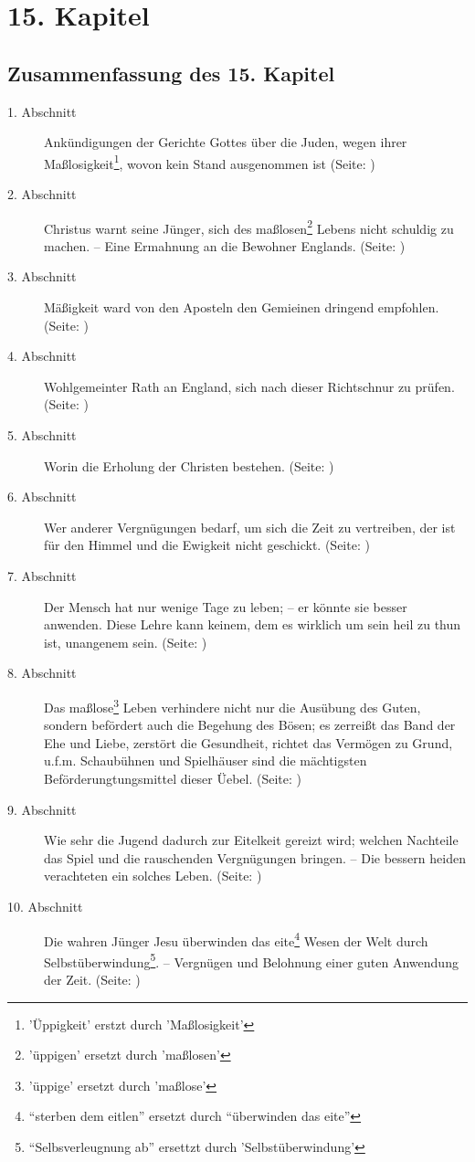 

\chapter{15. Kapitel} \label{kap15}

\section{Zusammenfassung des 15. Kapitel}
\small
\begin{description}
\item[1. Abschnitt] Ankündigungen der Gerichte Gottes über die Juden, wegen
ihrer Maßlosigkeit\footnote{'Üppigkeit' erstzt durch 'Maßlosigkeit'}, wovon
kein Stand ausgenommen ist (Seite: \pageref{kap15_ab1})
\item[2. Abschnitt] Christus warnt seine Jünger, sich des
maßlosen\footnote{'üppigen' ersetzt durch 'maßlosen'} Lebens nicht
schuldig zu machen. -- Eine Ermahnung an die Bewohner Englands. (Seite:
\pageref{kap15_ab2})
\item[3. Abschnitt] Mäßigkeit ward von den Aposteln den Gemieinen dringend
empfohlen. (Seite: \pageref{kap15_ab3})
\item[4. Abschnitt] Wohlgemeinter Rath an England, sich nach dieser Richtschnur
zu prüfen. (Seite: \pageref{kap15_ab4})
\item[5. Abschnitt] Worin die Erholung der Christen bestehen. (Seite:
\pageref{kap15_ab5})
\item[6. Abschnitt] Wer anderer Vergnügungen bedarf, um sich die Zeit zu
vertreiben, der ist für den Himmel und die Ewigkeit nicht geschickt. (Seite:
\pageref{kap15_ab6})
\item[7. Abschnitt] Der Mensch hat nur wenige Tage zu leben; -- er könnte sie
besser anwenden. Diese Lehre kann keinem, dem es wirklich um sein heil zu thun
ist, unangenem sein. (Seite: \pageref{kap15_ab6})
\item[8. Abschnitt] Das maßlose\footnote{'üppige' ersetzt durch 'maßlose'}
Leben verhindere nicht nur die Ausübung des
Guten, sondern befördert auch die Begehung des Bösen; es zerreißt das Band der
Ehe und Liebe, zerstört die Gesundheit, richtet das Vermögen zu Grund, u.f.m.
Schaubühnen und Spielhäuser sind die mächtigsten Beförderungtungsmittel dieser
Üebel. (Seite: \pageref{kap15_ab8})
\item[9. Abschnitt] Wie sehr die Jugend dadurch zur Eitelkeit gereizt wird;
welchen Nachteile das Spiel und die rauschenden Vergnügungen bringen. -- Die
bessern heiden verachteten ein solches Leben. (Seite: \pageref{kap15_ab9})
\item[10. Abschnitt] Die wahren Jünger Jesu überwinden das
eite\footnote{"`sterben dem eitlen"' ersetzt durch "`überwinden das eite"'}
Wesen der Welt
durch Selbstüberwindung\footnote{"`Selbsverleugnung ab"'  ersettzt durch
'Selbstüberwindung'}. -- Vergnügen und Belohnung einer guten Anwendung der
Zeit. (Seite: \pageref{kap15_ab10})


\end{description}
